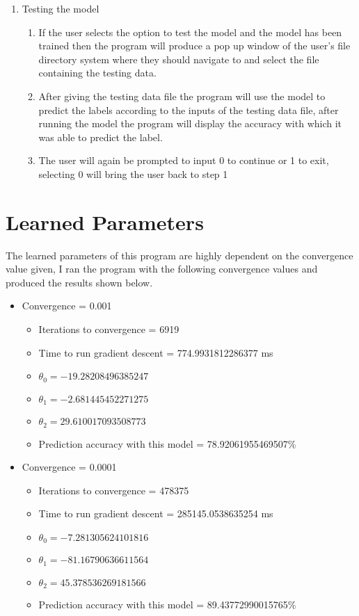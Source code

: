 \documentclass[10pt,a4paper]{article}
\begin{document}
\begin{enumerate}
	\item Testing the model
		\begin{enumerate}
			\item If the user selects the option to test the model and the model has been trained then the program will produce a pop up window of the user's file directory system where they should navigate to and select the file containing the testing data.
			\item After giving the testing data file the program will use the model to predict the labels according to the inputs of the testing data file, after running the model the program will display the accuracy with which it was able to predict the label.
			\item The user will again be prompted to input 0 to continue or 1 to exit, selecting 0 will bring the user back to step 1
		\end{enumerate}
	
	\end{enumerate}

	\section{Learned Parameters}
	\qquad The learned parameters of this program are highly dependent on the convergence value given, I ran the program with the following convergence values and produced the results shown below.
	\begin{itemize}
		\item Convergence = 0.001
		\begin{itemize}
			\item Iterations to convergence = 6919
			\item Time to run gradient descent = 774.9931812286377 ms
			\item $\theta_{0} = -19.28208496385247$
			\item $\theta_{1} = -2.681445452271275$
			\item $\theta_{2} = 29.610017093508773$
			\item Prediction accuracy with this model = 78.92061955469507\% 
		\end{itemize}
		\item Convergence = 0.0001
		\begin{itemize}
			\item Iterations to convergence = 478375
			\item Time to run gradient descent = 285145.0538635254 ms
			\item $\theta_{0} = -7.281305624101816$
			\item $\theta_{1} = -81.16790636611564$
			\item $\theta_{2} = 45.378536269181566$
			\item Prediction accuracy with this model = 89.43772990015765\% 
		\end{itemize}
	\end{itemize}
\end{document}
